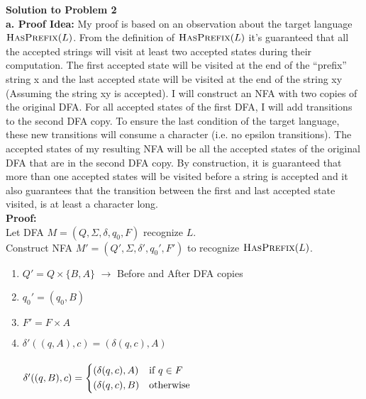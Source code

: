 \documentclass[letterpaper,12pt]{article}
\begin{document}
\noindent\textbf{Solution to Problem 2}\\

\textbf {a. Proof Idea:} My proof is based on an observation about the target language $\textsc{HasPrefix}(L)$. From the definition of $\textsc{HasPrefix}(L)$ it's guaranteed that all the accepted strings will visit at least two accepted states during their computation. The first accepted state will be visited at the end of the ``prefix'' string x and the last accepted state will be visited at the end of the string xy (Assuming the string xy is accepted). I will construct an NFA with two copies of the original DFA. For all accepted states of the first DFA, I will add transitions to the second DFA copy. To ensure the last condition of the target language, these new transitions will consume a character (i.e. no epsilon transitions). The accepted states of my resulting NFA will be all the accepted states of the original DFA that are in the second DFA copy. By construction, it is guaranteed that more than one accepted states will be visited before a string is accepted and it also guarantees that the transition between the first and last accepted state visited, is at least a character long.\\

\textbf{Proof:}\\
Let DFA $M = (Q, \Sigma, \delta, q_0, F)$ recognize $L$.\\ 
Construct NFA $M' = (Q', \Sigma, \delta', q_0', F')$ to recognize $\textsc{HasPrefix}(L)$.
\begin{enumerate}
    \item $Q' = Q \times \{B,A\}$ $\rightarrow$ Before and After DFA copies
    \item $q_0' = (q_0, B)$
    \item $F' = F \times {A}$
    \item $\delta' ((q,A), c) = (\delta(q,c), A)$ \\\\
    $ 
	\delta' ((q, B), c) = 
	\begin{dcases}
	    (\delta (q,c), A) & \text{if } q \in F \\
	    (\delta (q,c), B) & \text{otherwise}
	\end{dcases}
    $
\end{enumerate}
\end{document}
